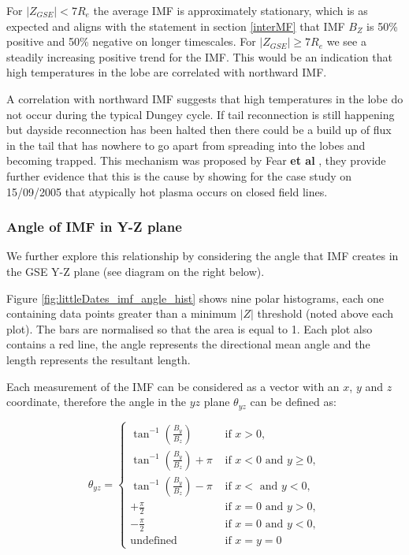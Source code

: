 \documentclass[12pt]{article}
\begin{document}
For $|Z_{GSE}|<7R_e$ the average IMF is approximately stationary, which is as expected and aligns with the statement in section \ref{interMF} that IMF $B_Z$ is 50\% positive and 50\% negative on longer timescales. For $|Z_{GSE}|\ge7R_e$ we see a steadily increasing positive trend for the IMF. This would be an indication that high temperatures in the lobe are correlated with northward IMF. 

A correlation with northward IMF suggests that high temperatures in the lobe do not occur during the typical Dungey cycle. If tail reconnection is still happening but dayside reconnection has been halted then there could be a build up of flux in the tail that has nowhere to go apart from spreading into the lobes and becoming trapped. This mechanism was proposed by Fear \textbf{et al} \cite{Fear1506}, they provide further evidence that this is the cause by showing for the case study on 15/09/2005 that atypically hot plasma occurs on closed field lines.

\subsubsection{Angle of IMF in Y-Z plane}
We further explore this relationship by considering the angle that IMF creates in the GSE Y-Z plane (see diagram on the right below).

Figure \ref{fig:littleDates_imf_angle_hist} shows nine polar histograms, each one containing data points greater than a minimum $|Z|$ threshold (noted above each plot). The bars are normalised so that the area is equal to 1. Each plot also contains a red line, the angle represents the directional mean angle \cite{mardia_jupp_2000} and the length represents the resultant length. 

Each measurement of the IMF can be considered as a vector with an $x$, $y$ and $z$ coordinate, therefore the angle in the $yz$ plane $\theta_{yz}$ can be defined as:

\begin{equation}
    \theta_{yz}= 
    \begin{cases}
        \tan^{-1}\left(\frac{B_y}{B_z}\right) &\text{ if } x>0, \\
        \tan^{-1}\left(\frac{B_y}{B_z}\right)+\pi &\text{ if } x < 0 \text{ and } y \ge 0, \\
        \tan^{-1}\left(\frac{B_y}{B_z}\right)-\pi &\text{ if } x < \text{ and } y < 0, \\
        +\frac{\pi}{2} &\text{ if } x=0 \text{ and } y > 0, \\
        -\frac{\pi}{2} &\text{ if } x=0 \text{ and } y<0, \\
        \text{undefined} &\text{ if } x=y=0
    \end{cases}
\end{equation}
\end{document}

